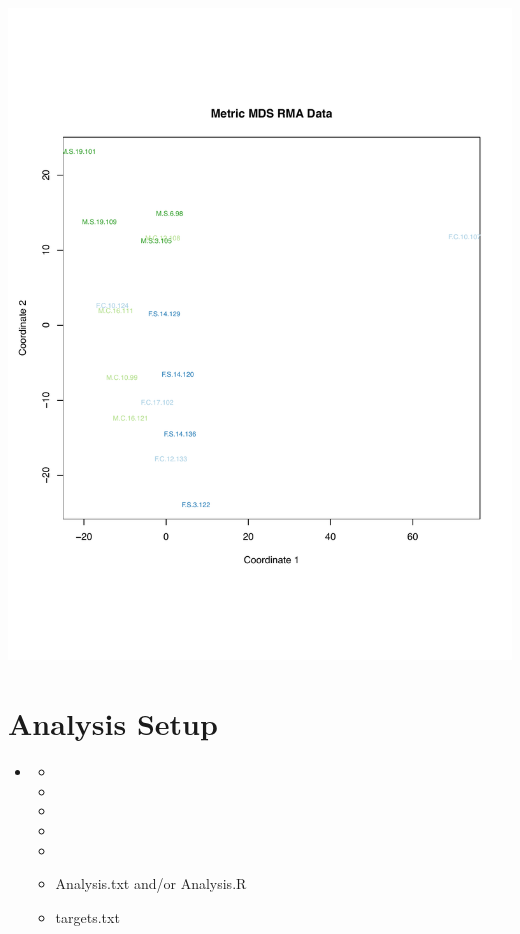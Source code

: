 \documentclass[pdf]{beamer}
\begin{document}
\begin{frame}
\begin{center}
\includegraphics[scale=0.3]{figures/normMDS.pdf} 
\end{center}
\end{frame}

\section{Analysis Setup}
\begin{frame}
  \begin{itemize}
    \item {}
    \begin{itemize}
      \item {}
      \item {}
      \item {}
      \item {}
      \item {}
      \item Analysis.txt and/or Analysis.R
      \item targets.txt
    \end{itemize}
  \end{itemize}
\end{frame}
\end{document}
